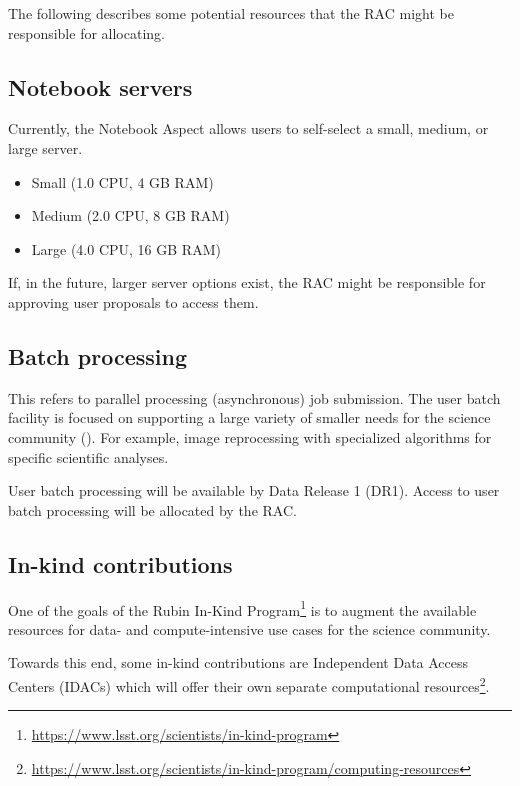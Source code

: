 The following describes some potential resources that the RAC might be responsible for allocating.


\subsection{Notebook servers}\label{ssec:resources-NBs}

Currently, the Notebook Aspect allows users to self-select a small, medium, or large server.

\begin{itemize}
\item Small (1.0 CPU, 4 GB RAM)
\item Medium (2.0 CPU, 8 GB RAM)
\item Large (4.0 CPU, 16 GB RAM)
\end{itemize}

If, in the future, larger server options exist, the RAC might be responsible for approving user proposals to access them.


\subsection{Batch processing}\label{ssec:resources-batch}

This refers to parallel processing (asynchronous) job submission.
The user batch facility is focused on supporting a large variety of smaller needs for the science community ().
For example, image reprocessing with specialized algorithms for specific scientific analyses.

User batch processing will be available by Data Release 1 (DR1).
Access to user batch processing will be allocated by the RAC.


\subsection{In-kind contributions}\label{ssec:resources-inkind}

One of the goals of the Rubin In-Kind Program\footnote{\url{https://www.lsst.org/scientists/in-kind-program}} is to augment the available resources for data- and compute-intensive use cases for the science community.

Towards this end, some in-kind contributions are Independent Data Access Centers (IDACs) which will offer their own separate computational resources\footnote{\url{https://www.lsst.org/scientists/in-kind-program/computing-resources}}.

